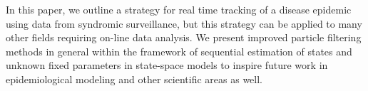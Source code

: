 \documentclass{elsarticle}
\begin{document}
In this paper, we outline a strategy for real time tracking of a disease epidemic using data from syndromic surveillance, but this strategy can be applied to many other fields requiring on-line data analysis. We present improved particle filtering methods in general within the framework of sequential estimation of states and unknown fixed parameters in state-space models to inspire future work in epidemiological modeling and other scientific areas as well.

\clearpage



\end{document}
